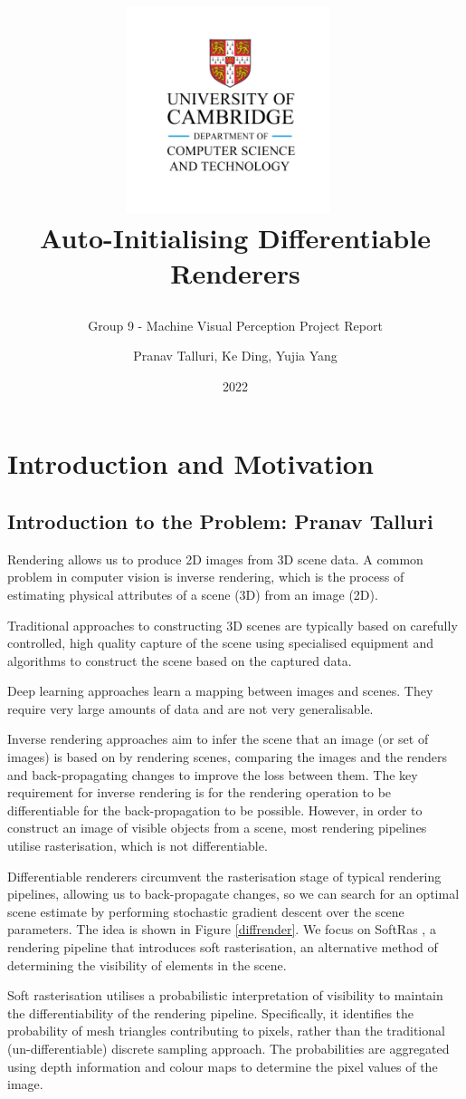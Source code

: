 \documentclass{article}
\subtitle{Group 9 - Machine Visual Perception Project Report}
\title{
    \begin{center}
    \includegraphics[width=0.45\textwidth]{cst.jpg}~
    \\[0.1cm]
    \Huge Auto-Initialising Differentiable Renderers
    \end{center}
}
\author{Pranav Talluri, Ke Ding, Yujia Yang}
\date{2022}
\begin{document}
\maketitle
\newpage
\tableofcontents
\newpage
\section{Introduction and Motivation}
\subsection{Introduction to the Problem: Pranav Talluri}

Rendering allows us to produce 2D images from 3D scene data. A common problem in computer vision is inverse rendering, which is the process of estimating physical attributes of a scene (3D) from an image (2D).

Traditional approaches to constructing 3D scenes are typically based on carefully controlled, high quality capture of the scene using specialised equipment and algorithms to construct the scene based on the captured data. 

Deep learning approaches learn a mapping between images and scenes. They require very large amounts of data and are not very generalisable.

Inverse rendering approaches aim to infer the scene that an image (or set of images) is based on by rendering scenes, comparing the images and the renders and back-propagating changes to improve the loss between them. The key requirement for inverse rendering is for the rendering operation to be differentiable for the back-propagation to be possible. However, in order to construct an image of visible objects from a scene, most rendering pipelines utilise rasterisation, which is not differentiable.

Differentiable renderers circumvent the rasterisation stage of typical rendering pipelines, allowing us to back-propagate changes, so we can search for an optimal scene estimate by performing stochastic gradient descent over the scene parameters. The idea is shown in Figure \ref{diffrender}. We focus on SoftRas \parencite{softras}, a rendering pipeline that introduces soft rasterisation, an alternative method of determining the visibility of elements in the scene.

Soft rasterisation utilises a probabilistic interpretation of visibility to maintain the differentiability of the rendering pipeline. Specifically, it identifies the probability of mesh triangles contributing to pixels, rather than the traditional (un-differentiable) discrete sampling approach. The probabilities are aggregated using depth information and colour maps to determine the pixel values of the image.
\end{document}
